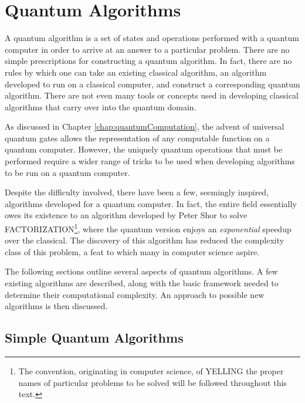 

\chapter{Quantum Algorithms}
\label{chap:quantumAlgorithms}
%

A quantum algorithm is a set of states and operations performed
with a quantum computer in order to arrive at an answer to a particular
problem.
There are no simple prescriptions for constructing a quantum algorithm.
In fact, there are no rules by which one can take an existing classical algorithm,
an algorithm developed to run on a classical computer, and construct
a corresponding quantum algorithm.  There are not even many tools or concepts
used in developing classical algorithms that carry over into the quantum
domain.

As discussed in Chapter \ref{chap:quantumComputation}, 
the advent of universal quantum gates
allows the representation of any computable function on a 
quantum computer.  However, the uniquely quantum operations that 
must be performed 
require a wider range of tricks to be used when developing
algorithms to be run on a quantum computer.

Despite the difficulty involved, there have been a few, seemingly
inspired, algorithms developed for a quantum computer.
In fact, the entire field essentially owes its existence to 
an algorithm developed by Peter Shor\cite{Shor:94,Shor:00}
to solve FACTORIZATION\footnote{The convention, originating in computer 
science, of YELLING the proper names of particular problems to be solved 
will be followed throughout this text.}, where the quantum version 
enjoys an \emph{exponential} speedup over the classical.  
The discovery of this algorithm has reduced the complexity class of 
this problem, a feat to which many in computer science aspire.

The following sections outline several aspects of quantum
algorithms.  A few existing algorithms are described, along
with the basic framework needed to determine their computational
complexity.  An approach to possible new algorithms is then 
discussed.

\section{Simple Quantum Algorithms}

